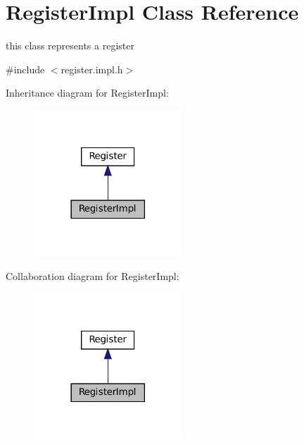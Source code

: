 \hypertarget{classRegisterImpl}{}\section{Register\+Impl Class Reference}
\label{classRegisterImpl}


this class represents a register  




{\ttfamily \#include $<$register.\+impl.\+h$>$}



Inheritance diagram for Register\+Impl\+:
\nopagebreak
\begin{figure}[H]
\begin{center}
\leavevmode
\includegraphics[width=158pt]{classRegisterImpl__inherit__graph}
\end{center}
\end{figure}


Collaboration diagram for Register\+Impl\+:
\nopagebreak
\begin{figure}[H]
\begin{center}
\leavevmode
\includegraphics[width=158pt]{classRegisterImpl__coll__graph}
\end{center}
\end{figure}
